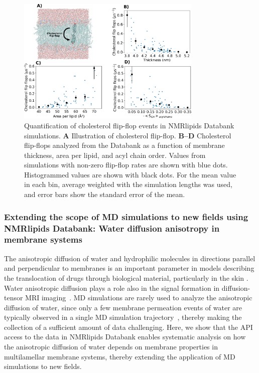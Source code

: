 \documentclass[fleqn,10pt]{wlscirep}
\begin{document}
\begin{figure}[htb]
    \centering
    \includegraphics[width=88mm]{Figures/CholFlipFlops.pdf}
    \caption{Quantification of cholesterol flip-flop events in NMRlipids Databank simulations. 
    \textbf{A} Illustration of cholesterol flip-flop.  
      \textbf{B--D} Cholesterol flip-flops analyzed from the Databank as a function of membrane thickness, area per lipid, and acyl chain order. Values from simulations with non-zero flip-flop rates are shown with blue dots. Histogrammed values are shown with black dots. For the mean value in each bin, average weighted with the simulation lengths was used, and error bars show the standard error of the mean.
    }
    \label{fig:flip-flops}
\end{figure}



\subsubsection{Extending the scope of MD simulations to new fields using NMRlipids Databank: Water diffusion anisotropy in membrane systems}
The anisotropic diffusion of water and hydrophilic molecules in directions parallel and perpendicular to membranes is an important parameter in models describing the translocation of drugs through biological material, particularly in the skin \cite{hansen13,wen18,nitsche19,roberts21}. Water anisotropic diffusion plays a role also in the signal formation in diffusion-tensor MRI imaging~\cite{topgaard20}. MD simulations are rarely used to analyze the anisotropic diffusion of water, since only a few membrane permeation events of water are typically observed in a single MD simulation trajectory~\cite{venable19,camilo2022}, thereby making the collection of a sufficient amount of data challenging. Here, we show that the API access to the data in NMRlipids Databank enables systematic analysis on how the anisotropic diffusion of water depends on membrane properties in multilamellar membrane systems, thereby extending the application of MD simulations to new fields. 
\end{document}
